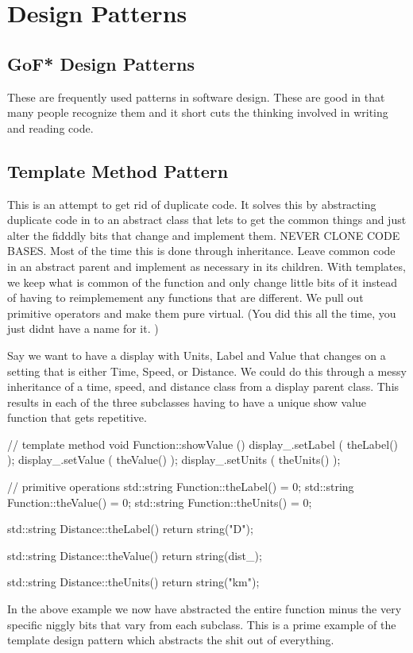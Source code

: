\documentclass[12pt]{article}
\begin{document}
\section{Design Patterns}

\subsection{GoF* Design Patterns}
These are frequently used patterns in software design. These are good in that many people recognize them and it short cuts the thinking involved in writing and reading code.

\subsection{Template Method Pattern}
This is an attempt to get rid of duplicate code. It solves this by abstracting duplicate code in to an abstract class that lets to get the common things and just alter the fidddly bits that change and implement them. NEVER CLONE CODE BASES. Most of the time this is done through inheritance. Leave common code in an abstract parent and implement as necessary in its children. With templates, we keep what is common of the function and only change little bits of it instead of having to reimplemement any functions that are different. We pull out primitive operators and make them pure virtual. (You did this all the time, you just didnt have a name for it. )

Say we want to have a display with Units, Label and Value that changes on a setting that is either Time, Speed, or Distance. We could do this through a messy inheritance of a time, speed, and distance class from a display parent class. This results in each of the three subclasses having to have a unique show value function that gets repetitive.

\begin{lstlistings}
// template method
void Function::showValue () {
    display_.setLabel ( theLabel() );
    display_.setValue ( theValue() );
    display_.setUnits ( theUnits() );
}

// primitive operations
std::string Function::theLabel() = 0;
std::string Function::theValue() = 0;
std::string Function::theUnits() = 0;

std::string Distance::theLabel() {
    return string("D");
}

std::string Distance::theValue() {
    return string(dist_);
}

std::string Distance::theUnits() {
    return string("km");
}
\end{lstlistings}
In the above example we now have abstracted the entire function minus the very specific niggly bits that vary from each subclass. This is a prime example of the template design pattern which abstracts the shit out of everything.
\end{document}
